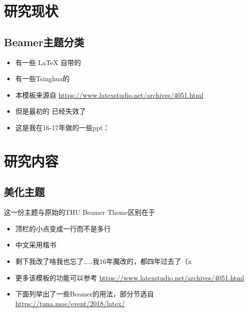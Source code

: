 \documentclass[aspectratio=43]{beamer} %
\begin{document}
\section{研究现状}

\subsection{Beamer主题分类}

\begin{frame}
    \begin{itemize}
        \item 有一些 \LaTeX{} 自带的
        \item 有一些Tsinghua的
        \item 本模板来源自 \newline \url{https://www.latexstudio.net/archives/4051.html}
        \item 但是最初的 \href{http://far.tooold.cn/post/latex/beamertsinghua}{\color{purple}{link}} \cite{origin}已经失效了
        \item 这是我在16-17年做的一些ppt：\href{https://github.com/Trinkle23897/oi_slides}{\color{purple}{戳我}}
    \end{itemize}
\end{frame}


\section{研究内容}

\subsection{美化主题}

\begin{frame}{这一份主题与原始的THU Beamer Theme区别在于}
    \begin{itemize}
        \item 顶栏的小点变成一行而不是多行
        \item 中文采用楷书
        \item 剩下我改了啥我也忘了……我16年魔改的，都四年过去了（x
        \item 更多该模板的功能可以参考 \url{https://www.latexstudio.net/archives/4051.html}
        \item 下面列举出了一些Beamer的用法，部分节选自 \url{https://tuna.moe/event/2018/latex/}
    \end{itemize}
\end{frame}
\end{document}
